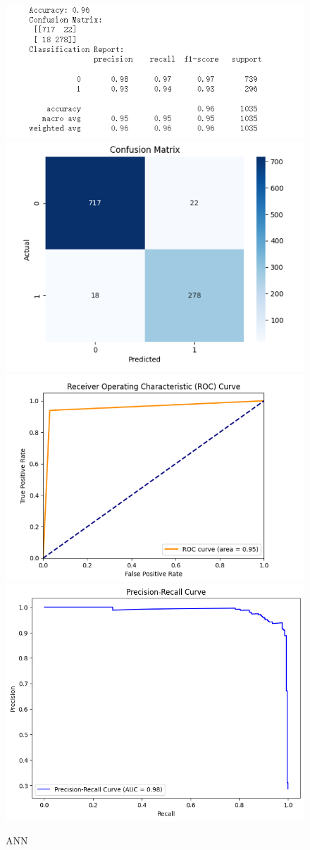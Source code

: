 \documentclass[conference]{IEEEtran}
\begin{document}
\begin{figure}[h]
\centering
    \includegraphics[width=.4\textwidth]{ANN/ANN1.png}
    \includegraphics[width=.4\textwidth]{ANN/ANN2.png}
    \\[\smallskipamount]
    \includegraphics[width=.4\textwidth]{ANN/ANN3.png}
    \includegraphics[width=.4\textwidth]{ANN/ANN4.png}
    \caption{ANN}\label{ANN}
\end{figure}
\end{document}
